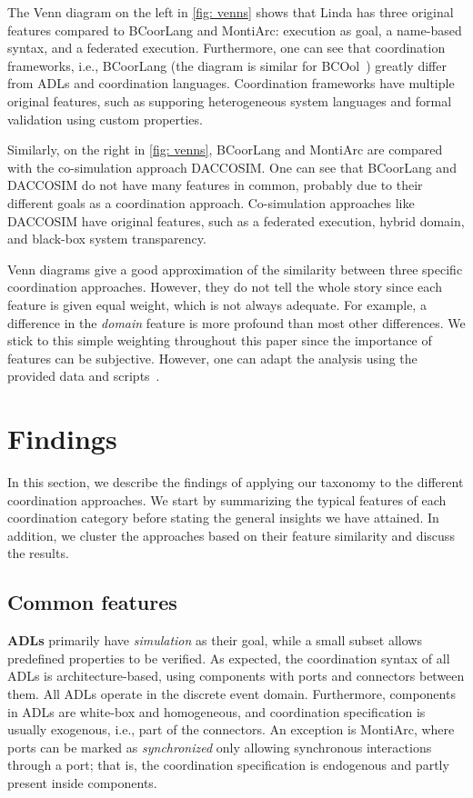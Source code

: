 \documentclass[runningheads]{llncs}
\begin{document}
The Venn diagram on the left in \autoref{fig: venns} shows that Linda has three original features compared to BCoorLang and MontiArc:
execution as goal, a name-based syntax, and a federated execution.
Furthermore, one can see that coordination frameworks, i.e., BCoorLang (the diagram is similar for BCOol~\cite{varalarsenBehavioralCoordinationOperator2015,varalarsenBCOolBehavioralCoordination2016}) greatly differ from ADLs and coordination languages.
Coordination frameworks have multiple original features, such as supporing heterogeneous system languages and formal validation using custom properties.

Similarly, on the right in \autoref{fig: venns}, BCoorLang and MontiArc are compared with the co-simulation approach DACCOSIM.
One can see that BCoorLang and DACCOSIM do not have many features in common, probably due to their different goals as a coordination approach.
Co-simulation approaches like DACCOSIM have original features, such as a federated execution, hybrid domain, and black-box system transparency.

Venn diagrams give a good approximation of the similarity between three specific coordination approaches.
However, they do not tell the whole story since each feature is given equal weight, which is not always adequate.
For example, a difference in the \textit{domain} feature is more profound than most other differences.
We stick to this simple weighting throughout this paper since the importance of features can be subjective.
However, one can adapt the analysis using the provided data and scripts~\cite{timkrauterArtifactsCoordination2024}.

\section{Findings} \label{sec: findings}

In this section, we describe the findings of applying our taxonomy to the different coordination approaches.
We start by summarizing the typical features of each coordination category before stating the general insights we have attained.
In addition, we cluster the approaches based on their feature similarity and discuss the results.

\subsection{Common features}

\textbf{ADLs} primarily have \textit{simulation} as their goal, while a small subset allows predefined properties to be verified.
As expected, the coordination syntax of all ADLs is architecture-based, using components with ports and connectors between them.
All ADLs operate in the discrete event domain.
Furthermore, components in ADLs are white-box and homogeneous, and coordination specification is usually exogenous, i.e., part of the connectors.
An exception is MontiArc, where ports can be marked as \textit{synchronized} only allowing synchronous interactions through a port; that is, the coordination specification is endogenous and partly present inside components.
\end{document}
